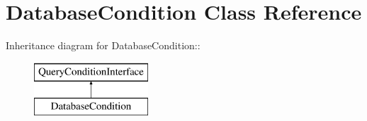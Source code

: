 \hypertarget{classDatabaseCondition}{
\section{DatabaseCondition Class Reference}
\label{classDatabaseCondition}
}
Inheritance diagram for DatabaseCondition::\begin{figure}[H]
\begin{center}
\leavevmode
\includegraphics[height=2cm]{classDatabaseCondition}
\end{center}
\end{figure}
